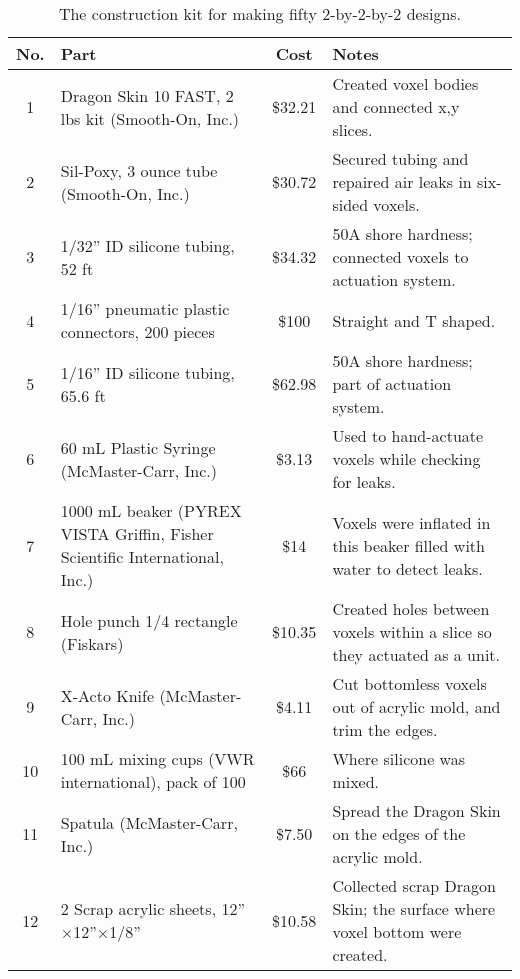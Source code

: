 
\renewcommand{\arraystretch}{1.3}
\setlength\tabcolsep{5pt}

\begin{table*}
\caption{\label{table:core_materials}The construction kit for making fifty 2-by-2-by-2 designs.}
\vspace{-1.5em}
\begin{scriptsize}
\begin{center}
\begin{tabular}{clcl} 
 \toprule
 \textbf{No.} & \textbf{Part} & \textbf{Cost} & \textbf{Notes} \\ 
 \toprule
 1 & Dragon Skin 10 FAST, 2 lbs kit (Smooth-On, Inc.) & \$32.21 & Created voxel bodies and connected x,y slices. \\ 
 \rowcolor{gray!25}
 2 & Sil-Poxy, 3 ounce tube (Smooth-On, Inc.) & \$30.72 & Secured tubing and repaired air leaks in six-sided voxels. \\ 
 3 & 1/32'' ID silicone tubing, 52 ft & \$34.32 & 50A shore hardness; connected voxels to actuation system. \\ 
 \rowcolor{gray!25}
 4 & 1/16'' pneumatic plastic connectors, 200 pieces & \$100 & Straight and T shaped. \\ 
 5 & 1/16'' ID silicone tubing, 65.6 ft & \$62.98 & 50A shore hardness; part of actuation system. \\ 
 \rowcolor{gray!25}
 6 & 60 mL Plastic Syringe (McMaster-Carr, Inc.) & \$3.13 &  Used to hand-actuate voxels while checking for leaks. \\
 \multirow{2}{*}{7} & \multirow{2}{22em}{1000 mL beaker (PYREX VISTA Griffin, Fisher Scientific International, Inc.)} & \multirow{2}{*}{\$14} & \multirow{2}{*}{Voxels were inflated in this beaker filled with water to detect leaks.} \\
  & & & \\ 
  \rowcolor{gray!25}
 8 & Hole punch 1/4 rectangle (Fiskars) & \$10.35 & Created holes between voxels within a slice so they actuated as a unit. \\ 
 9 & X-Acto Knife (McMaster-Carr, Inc.) & \$4.11 & Cut bottomless voxels out of acrylic mold, and trim the edges. \\ 
 \rowcolor{gray!25}
 10 & 100 mL mixing cups (VWR international), pack of 100 & \$66 & Where silicone was mixed. \\ 
 11 & Spatula (McMaster-Carr, Inc.) & \$7.50 & Spread the Dragon Skin on the edges of the acrylic mold. \\ 
 \rowcolor{gray!25}
 12 & 2 Scrap acrylic sheets, 12''$\times$12''$\times$1/8'' & \$10.58 & Collected scrap Dragon Skin; the surface where voxel bottom were created. \\ 

\end{tabular}
\end{center}
\end{scriptsize}
\end{table*}

